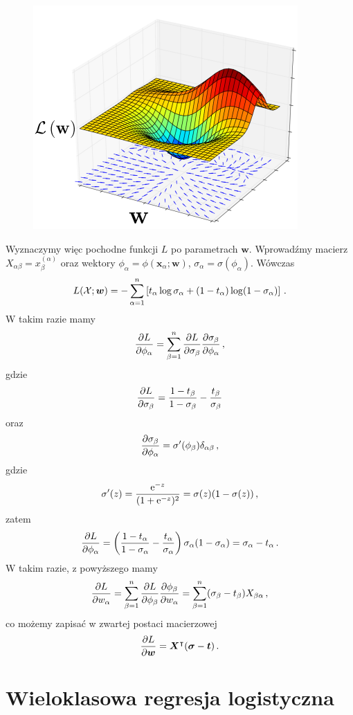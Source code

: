 \documentclass{myclass}
\begin{document}
\begin{figure}[ht]
    \centering
    \includegraphics[width=0.85\columnwidth]{figs/image.png}
\end{figure}
Wyznaczymy więc pochodne funkcji \(L\) po parametrach \(\bm{w}\). Wprowadźmy macierz
\(X_{\alpha\beta} = x_\beta^{(\alpha)}\) oraz wektory \(\phi_\alpha = \phi(\bm{x}_\alpha; \bm{w})\),
\(\sigma_\alpha = \sigma(\phi_\alpha)\). Wówczas
\[
L(\mathcal{X}; \bm{w}) = - \sum_{\alpha=1}^n \left[ t_\alpha \log \sigma_\alpha + (1 - t_\alpha) \log(1 - \sigma_\alpha) \right]\,.
\]
W takim razie mamy
\[
\pdv{L}{\phi_\alpha} = \sum_{\beta=1}^n \pdv{L}{\sigma_\beta} \pdv{\sigma_\beta}{\phi_\alpha}\,,
\]
gdzie
\[
\pdv{L}{\sigma_\beta} = \frac{1 - t_\beta}{1 - \sigma_\beta} - \frac{t_\beta}{\sigma_\beta}
\]
oraz
\[
\pdv{\sigma_\beta}{\phi_\alpha} = \sigma'(\phi_\beta) \delta_{\alpha\beta}\,,
\]
gdzie
\[
\sigma'(z) = \frac{\mathrm{e}^{-z}}{(1 + \mathrm{e}^{-z})^2} = \sigma(z)(1 - \sigma(z))\,,
\]
zatem
\[
\pdv{L}{\phi_\alpha} = \left(\frac{1 - t_\alpha}{1 - \sigma_\alpha} - \frac{t_\alpha}{\sigma_\alpha}\right)\sigma_\alpha(1 - \sigma_\alpha) = \sigma_\alpha - t_\alpha\,.
\]
W takim razie, z powyższego mamy
\[
\pdv{L}{w_\alpha} = \sum_{\beta=1}^n \pdv{L}{\phi_\beta} \pdv{\phi_\beta}{w_\alpha} = \sum_{\beta=1}^n (\sigma_\beta - t_\beta) X_{\beta\alpha}\,,
\]
co możemy zapisać w zwartej postaci macierzowej
\[
\pdv{L}{\bm{w}} = \bm{X}^\intercal (\bm{\sigma} - \bm{t})\,.
\]

\section{Wieloklasowa regresja logistyczna}
\end{document}
